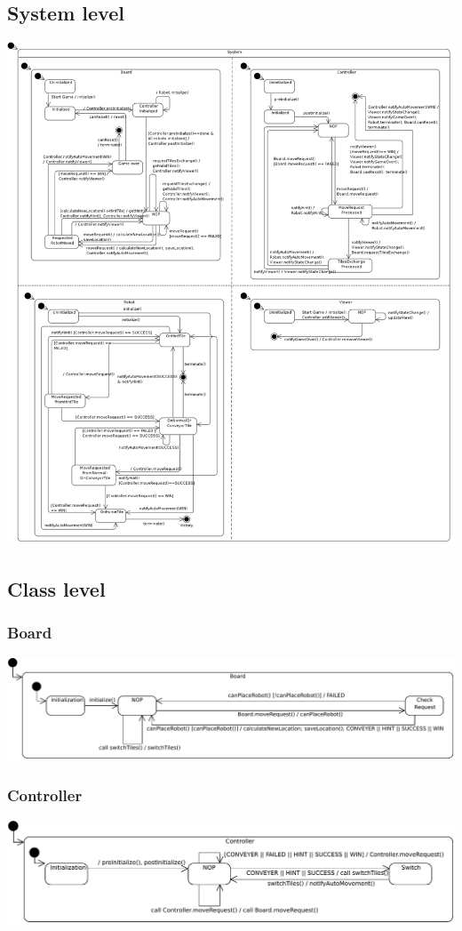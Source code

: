 \subsection{System level}
	\includegraphics[width=\linewidth]{statecharts/system.pdf}

\subsection{Class level}
	\subsubsection{Board} 
		\includegraphics[width=\linewidth]{statecharts/board.pdf}
	\subsubsection{Controller}
		\includegraphics[width=\linewidth]{statecharts/controller.pdf}
